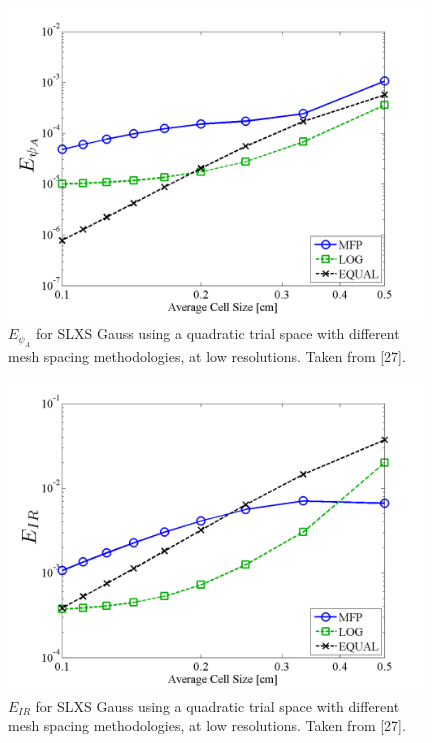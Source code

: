 \begin{figure}[!htp]
\centering
\includegraphics[width=11cm]{chapter3_variable_xs/LOW_RES_P2_GAUSS_E_PSI_A.png}
\caption{$E_{\psi_A}$ for SLXS Gauss using a quadratic trial space with different mesh spacing methodologies, at low resolutions.  Taken from [27].}
\label{fig:low_res_gauss_psi_A}
\end{figure}
%
\begin{figure}[!hbp]
\centering
\includegraphics[width=11cm]{chapter3_variable_xs/LOW_RES_P2_GAUSS_E_IR.png}
\caption{$E_{IR}$ for SLXS Gauss using a quadratic trial space with different mesh spacing methodologies, at low resolutions.  Taken from [27].}
\label{fig:low_res_gauss_ir}
\end{figure}
%
